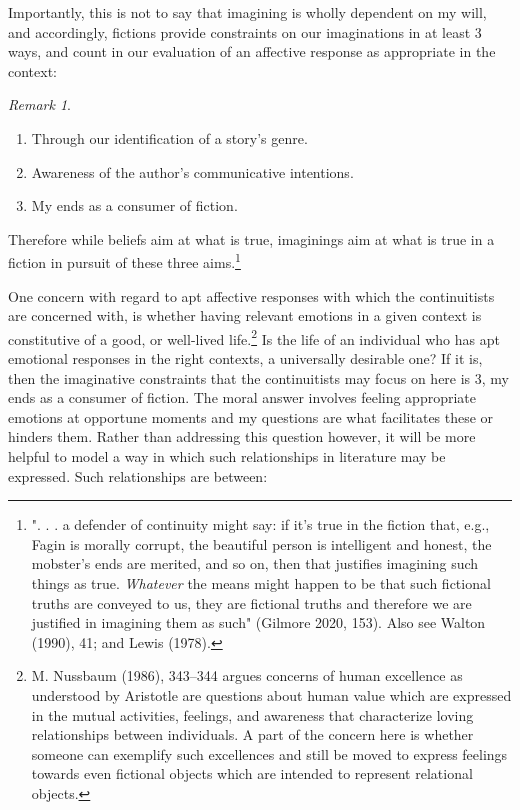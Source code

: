 \documentclass[12pt]{book}
\theoremstyle{definition}
\theoremstyle{remark}
\newtheorem{remark}[theorem]{Remark}
\providecommand{\tightlist}{%
  \setlength{\itemsep}{0pt}\setlength{\parskip}{0pt}}
\begin{document}
Importantly, this is not to say that imagining is wholly dependent on my will, and accordingly, fictions provide constraints on our imaginations in at least 3 ways, and count in our evaluation of an affective response as appropriate in the context:

\begin{remark}
\leavevmode

\begin{enumerate}
\def\labelenumi{\arabic{enumi}.}
\tightlist
\item
  Through our identification of a story's genre.
\item
  Awareness of the author's communicative intentions.
\item
  My ends as a consumer of fiction.
\end{enumerate}

\end{remark}

\noindent Therefore while beliefs aim at what is true, imaginings aim at what is true in a fiction in pursuit of these three aims.\footnote{". . . a defender of continuity might say: if it's true in the fiction that, e.g., Fagin is morally corrupt, the beautiful person is intelligent and honest, the mobster's ends are merited, and so on, then that justifies imagining such things as true. \emph{Whatever} the means might happen to be that such fictional truths are conveyed to us, they are fictional truths and therefore we are justified in imagining them as such" (Gilmore 2020, 153). Also see Walton (1990), 41; and Lewis (1978).}

One concern with regard to apt affective responses with which the continuitists are concerned with, is whether having relevant emotions in a given context is constitutive of a good, or well-lived life.\footnote{M. Nussbaum (1986), 343--344 argues concerns of human excellence as understood by Aristotle are questions about human value which are expressed in the mutual activities, feelings, and awareness that characterize loving relationships between individuals. A part of the concern here is whether someone can exemplify such excellences and still be moved to express feelings towards even fictional objects which are intended to represent relational objects.} Is the life of an individual who has apt emotional responses in the right contexts, a universally desirable one? If it is, then the imaginative constraints that the continuitists may focus on here is 3, my ends as a consumer of fiction. The moral answer involves feeling appropriate emotions at opportune moments and my questions are what facilitates these or hinders them. Rather than addressing this question however, it will be more helpful to model a way in which such relationships in literature may be expressed. Such relationships are between:
\end{document}
